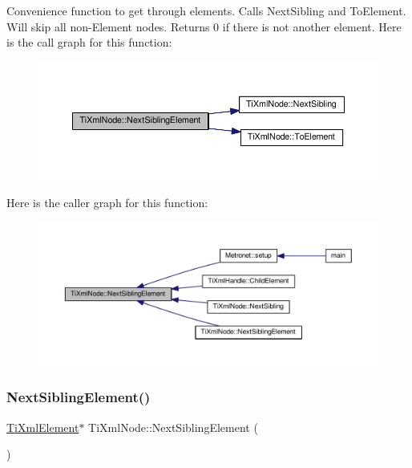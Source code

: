 Convenience function to get through elements. Calls Next\+Sibling and To\+Element. Will skip all non-\/\+Element nodes. Returns 0 if there is not another element. Here is the call graph for this function\+:\nopagebreak
\begin{figure}[H]
\begin{center}
\leavevmode
\includegraphics[width=350pt]{class_ti_xml_node_ac6105781c913a42aa7f3f17bd1964f7c_cgraph}
\end{center}
\end{figure}
Here is the caller graph for this function\+:\nopagebreak
\begin{figure}[H]
\begin{center}
\leavevmode
\includegraphics[width=350pt]{class_ti_xml_node_ac6105781c913a42aa7f3f17bd1964f7c_icgraph}
\end{center}
\end{figure}
\mbox{\label{class_ti_xml_node_a1b211cb5034655a04358e0e2f6fc5010}} 
\subsubsection{\texorpdfstring{Next\+Sibling\+Element()}{NextSiblingElement()}\hspace{0.1cm}{\footnotesize\ttfamily [2/4]}}
{\footnotesize\ttfamily \hyperlink{class_ti_xml_element}{Ti\+Xml\+Element}$\ast$ Ti\+Xml\+Node\+::\+Next\+Sibling\+Element (\begin{DoxyParamCaption}{ }\end{DoxyParamCaption})\hspace{0.3cm}{\ttfamily [inline]}}

